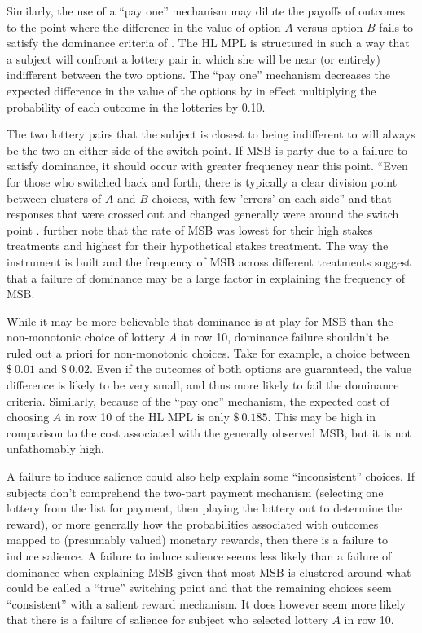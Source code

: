 \documentclass[11pt,a4paper]{report}
\newcommand{\money}[1]{$\$\!\:#1$}          %
\begin{document}
Similarly, the use of a \enquote{pay one} mechanism may dilute the payoffs of outcomes to the point where the difference in the value of option $A$ versus option $B$ fails to satisfy the dominance criteria of \textcite{Smith1982}.
The HL MPL is structured in such a way that a subject will confront a lottery pair in which she will be near (or entirely) indifferent between the two options.
The \enquote{pay one} mechanism decreases the expected difference in the value of the options by in effect multiplying the probability of each outcome in the lotteries by 0.10. 

The two lottery pairs that the subject is closest to being indifferent to will always be the two on either side of the switch point.
If MSB is party due to a failure to satisfy dominance, it should occur with greater frequency near this point.
\textcite[1648]{Holt2002} \enquote{Even for those who switched back and forth, there is typically a clear division point between clusters of $A$ and $B$ choices, with few 'errors' on each side} and that responses that were crossed out and changed generally were around the switch point \parencite*[1646]{Holt2002}.
\textcite[1647-1648]{Holt2002} further note that the rate of MSB was lowest for their high stakes treatments and highest for their hypothetical stakes treatment.
The way the instrument is built and the frequency of MSB across different treatments suggest that a failure of dominance may be a large factor in explaining the frequency of MSB.

While it may be more believable that dominance is at play for MSB than the non-monotonic choice of lottery $A$ in row 10, dominance failure shouldn't be ruled out a priori for non-monotonic choices.
Take for example, a choice between \money{0.01} and \money{0.02}.
Even if the outcomes of both options are guaranteed, the value difference is likely to be very small, and thus more likely to fail the dominance criteria.
Similarly, because of the \enquote{pay one} mechanism, the expected cost of choosing $A$ in row 10 of the HL MPL is only \money{0.185}.
This may be high in comparison to the cost associated with the generally observed MSB, but it is not unfathomably high.

A failure to induce salience could also help explain some \enquote{inconsistent} choices.
If subjects don't comprehend the two-part payment mechanism (selecting one lottery from the list for payment, then playing the lottery out to determine the reward), or more generally how the probabilities associated with outcomes mapped to (presumably valued) monetary rewards, then there is a failure to induce salience.
A failure to induce salience seems less likely than a failure of dominance when explaining MSB given that most MSB is clustered around what could be called a \enquote{true} switching point and that the remaining choices seem \enquote{consistent} with a salient reward mechanism.
It does however seem more likely that there is a failure of salience for subject who selected lottery $A$ in row 10.
\end{document}
